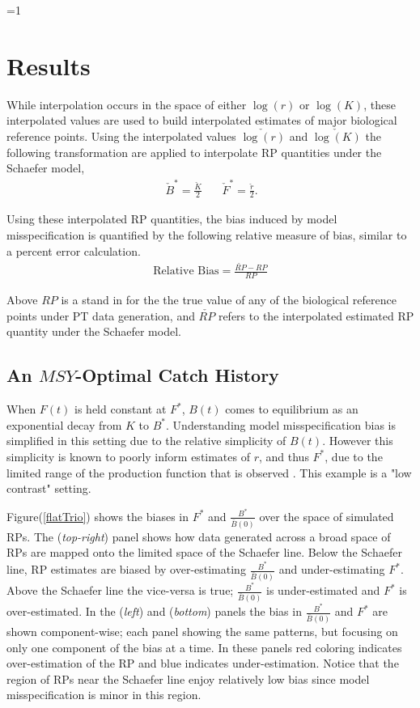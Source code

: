 \documentclass[12pt]{article}
\newcounter{alphasect}
\def\alphainsection{0}
\let\oldsection=\section
\def\section{%
  \ifnum\alphainsection=1%
    \addtocounter{alphasect}{1}
  \fi%
\oldsection}%
\begin{document}
%
\clearpage
\section{Results}

%
While interpolation occurs in the space of either $\log(r)$ or $\log(K)$, these 
interpolated values are used to build interpolated estimates of major biological 
reference points. Using the interpolated values $\check{\log(r)}$ and $\check{\log(K)}$
the following transformation are applied to interpolate RP quantities under the Schaefer 
model,
%
\begin{align}~
        \check B^* = \frac{\check K}{2} ~~~~~~~~
	\check F^* = \frac{\check r}{2}.  %
\end{align}

%
Using these interpolated RP quantities, the bias induced by model misspecification is 
quantified by the following relative measure of bias, similar to a percent error calculation.
%
\begin{align}
\text{Relative Bias} = \frac{\check{RP}-RP}{RP}
\end{align}

%
Above $RP$ is a stand in for the the true value of any of the biological 
reference points under PT data generation, and $\check{RP}$ refers to the 
interpolated estimated RP quantity under the Schaefer model.

\subsection{An $MSY$-Optimal Catch History \label{flat}}

%
When $F(t)$ is held constant at $F^*$, $B(t)$ comes to equilibrium as an 
exponential decay from $K$ to $B^*$. Understanding model misspecification bias 
is simplified in this setting due to the relative simplicity of $B(t)$. 
However this simplicity is known to poorly inform estimates of $r$, and thus $F^*$, 
due to the limited range of the production function that is observed . 
This example is a "low contrast" setting.

%
Figure(\ref{flatTrio}) shows the biases in $F^*$ and $\frac{B^*}{\bar B(0)}$ 
over the space of simulated RPs. The (\emph{top-right}) panel shows how data 
generated across a broad space of RPs are mapped onto the limited space of 
the Schaefer line. Below the Schaefer line, RP estimates are biased by 
over-estimating $\frac{B^*}{\bar B(0)}$ and under-estimating $F^*$. Above the 
Schaefer line the vice-versa is true; $\frac{B^*}{\bar B(0)}$ is under-estimated 
and $F^*$ is over-estimated. In the (\emph{left}) and (\emph{bottom}) panels the bias 
in $\frac{B^*}{\bar B(0)}$ and $F^*$ are shown component-wise; each panel showing 
the same patterns, but focusing on only one component of the bias at a time. In 
these panels red coloring indicates over-estimation of the RP and blue indicates 
under-estimation. Notice that the region of RPs near the Schaefer line enjoy 
relatively low bias since model misspecification is minor in this region.  
\end{document}
